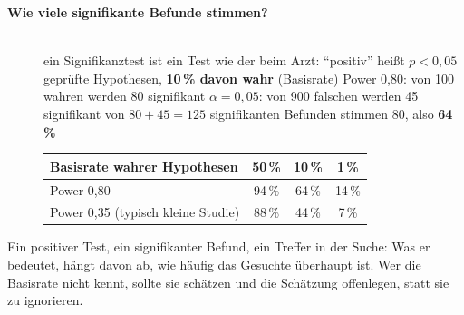 \begin{description}
\item[{\rot\bf Wie viele signifikante Befunde stimmen?}]~\\[-\lblskip]
\bi
  \ite ein Signifikanztest ist ein Test wie der beim Arzt:
    \enquote{positiv} heißt $p<0{,}05$
   geprüfte Hypothesen, \textbf{10\,\% davon wahr} (Basisrate)
  \ite Power 0,80: von 100 wahren werden 80 signifikant
  \ite $\alpha=0{,}05$: von 900 falschen werden 45 signifikant
  \ite von $80+45=125$ signifikanten Befunden stimmen 80, also
    \textbf{64\,\%}
\ei
\begin{center}
\small
\begin{tabular}{@{}lccc@{}}
\toprule
\textbf{Basisrate wahrer Hypothesen} & 50\,\% & 10\,\% & 1\,\% \\
\midrule
Power 0,80 & 94\,\% & 64\,\% & 14\,\% \\
Power 0,35 (typisch kleine Studie) & 88\,\% & 44\,\% & 7\,\% \\
\bottomrule
\end{tabular}
\end{center}
\os{\newpage}
\end{description}

\begin{merkbox}
Ein positiver Test, ein signifikanter Befund, ein Treffer in der Suche:
Was er bedeutet, hängt davon ab, wie häufig das Gesuchte überhaupt ist.
Wer die Basisrate nicht kennt, sollte sie schätzen und die Schätzung
offenlegen, statt sie zu ignorieren.
\end{merkbox}
\os{\newpage}

